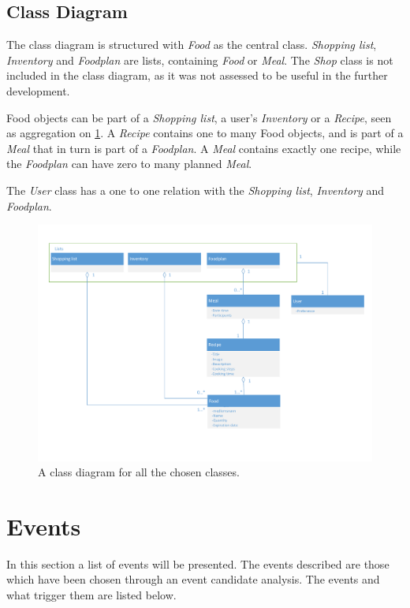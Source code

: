 \subsection{Class Diagram}
The class diagram is structured with \textit{Food} as the central class. 
\textit{Shopping list}, \textit{Inventory} and \textit{Foodplan} are lists, containing \textit{Food} or \textit{Meal}.
The \textit{Shop} class is not included in the class diagram, as it was not assessed to be useful in the further development.

Food objects can be part of a \textit{Shopping list}, a user's \textit{Inventory} or a \textit{Recipe}, seen as aggregation on \cref{fig:classDiagram}. A \textit{Recipe} contains one to many Food objects, and is part of a \textit{Meal} that in turn is part of a \textit{Foodplan}. A \textit{Meal} contains exactly one recipe, while the \textit{Foodplan} can have zero to many planned \textit{Meal}.

The \textit{User} class has a one to one relation with the \textit{Shopping list}, \textit{Inventory} and \textit{Foodplan}.
\begin{figure}[H]
	\centering
	\includegraphics[clip=true, width=1\textwidth, trim=1cm 3cm 3cm 0]{Grafik/FoodPlanner/Klasseting}
	\caption{A class diagram for all the chosen classes.}
	\label{fig:classDiagram}
\end{figure}

\section{Events} \label{EventsSection}
In this section a list of events will be presented. The events described are those which have been chosen through an event candidate analysis. The events and what trigger them are listed below.

